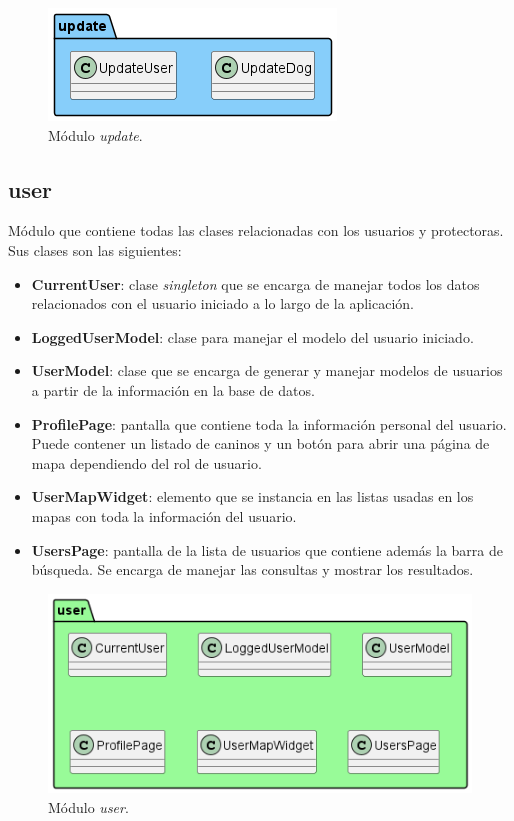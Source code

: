 \documentclass[a4paper, 12pt]{article}
\begin{document}
\begin{figure}[H]
	\begin{center}
		{\includegraphics[]{diagram/Update.png}\par}
		\caption{Módulo  \textit{update}.}
	\end{center}
\end{figure}



\subsection*{user}

Módulo que contiene todas las clases relacionadas con los usuarios y protectoras. Sus clases son las siguientes:

\begin{itemize}[noitemsep]
	\item \textbf{CurrentUser}: clase \textit{singleton} que se encarga de manejar todos los datos relacionados con el usuario iniciado a lo largo de la aplicación.
	\item \textbf{LoggedUserModel}: clase para manejar el modelo del usuario iniciado.
	\item \textbf{UserModel}: clase que se encarga de generar y manejar modelos de usuarios a partir de la información en la base de datos. 
	\item \textbf{ProfilePage}:  pantalla que contiene toda la información personal del usuario. Puede contener un listado de caninos y un botón para abrir una página de mapa dependiendo del rol de usuario.
	\item \textbf{UserMapWidget}: elemento que se instancia en las listas usadas en los mapas con toda la información del usuario.
	\item \textbf{UsersPage}: pantalla de la lista de usuarios que contiene además la barra de búsqueda. Se encarga de manejar las consultas y mostrar los resultados.
\end{itemize}

\begin{figure}[H]
	\begin{center}
		{\includegraphics[width=0.8\linewidth]{diagram/User.png}\par}
		\caption{Módulo  \textit{user}.}
	\end{center}
\end{figure}
\end{document}
